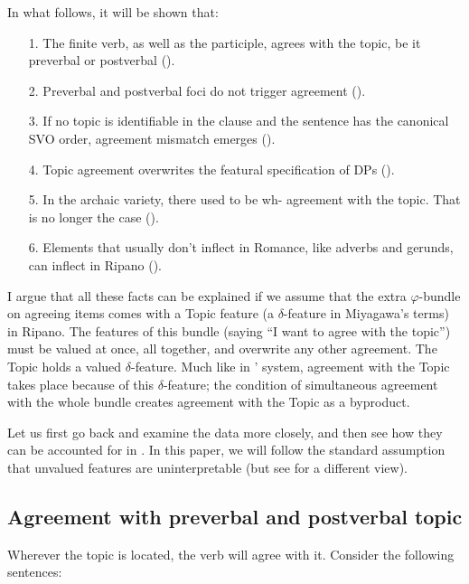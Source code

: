 \documentclass[output=paper
,modfonts
,nonflat]{langsci/langscibook}
\begin{document}
In what follows, it will be shown that:

\begin{enumerate}
\item[1.]The finite verb, as well as the participle, agrees with the topic, be it preverbal or postverbal ().
\item[2.]Preverbal and postverbal foci do not trigger agreement ().
\item[3.]If no topic is identifiable in the clause and the sentence has the canonical SVO order, agreement mismatch emerges ().
\item[4.]Topic agreement overwrites the featural specification of DPs ().
\item[5.]In the archaic variety, there used to be wh- agreement with the topic. That is no longer the case ().
\item[6.]Elements that usually don’t inflect in Romance, like adverbs and gerunds, can inflect in Ripano ().
\end{enumerate}
I argue that all these facts can be explained if we assume that the extra $\varphi $-bundle on agreeing items comes with a Topic feature (a $\delta $-feature in Miyagawa’s terms) in Ripano. The features of this bundle (saying “I want to agree with the topic”) must be valued at once, all together, and overwrite any other agreement. The Topic holds a valued $\delta $-feature. Much like in \citeauthor{Carstens2005a}’ system, agreement with the Topic takes place because of this $\delta $-feature; the condition of simultaneous agreement with the whole bundle creates agreement with the Topic as a byproduct.

\noindent Let us first go back and examine the data more closely, and then see how they can be accounted for in . In this paper, we will follow the standard assumption that unvalued features are uninterpretable (but see  \citealt{Pesetsky_Torrego2007} for a different view). 

\subsection{Agreement with preverbal and postverbal topic}\label{sec-dalessandro:4.2}
Wherever the topic is located, the verb will agree with it. Consider the following sentences:\largerpage
\end{document}
